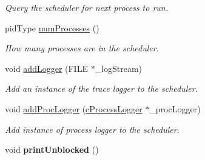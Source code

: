\begin{DoxyCompactItemize}
\begin{DoxyCompactList}\small\item\em \-Query the scheduler for next process to run. \end{DoxyCompactList}\item 
pid\-Type \hyperlink{classcFCFS_a0a72de791436a84120a534dd2fa0485d}{num\-Processes} ()
\begin{DoxyCompactList}\small\item\em \-How many processes are in the scheduler. \end{DoxyCompactList}\item 
void \hyperlink{classcFCFS_accb887eae7016719ce770d7b0284adea}{add\-Logger} (\-F\-I\-L\-E $\ast$\-\_\-log\-Stream)
\begin{DoxyCompactList}\small\item\em \-Add an instance of the trace logger to the scheduler. \end{DoxyCompactList}\item 
void \hyperlink{classcFCFS_a4da9f2fa83516ac5859772ae09169343}{add\-Proc\-Logger} (\hyperlink{classcProcessLogger}{c\-Process\-Logger} $\ast$\-\_\-proc\-Logger)
\begin{DoxyCompactList}\small\item\em \-Add instance of process logger to the scheduler. \end{DoxyCompactList}\item 
\hypertarget{classcFCFS_a37af1bbb7393f800a24ff22ee443f876}{void {\bfseries print\-Unblocked} ()}\label{d6/dc3/classcFCFS_a37af1bbb7393f800a24ff22ee443f876}

\end{DoxyCompactItemize}
